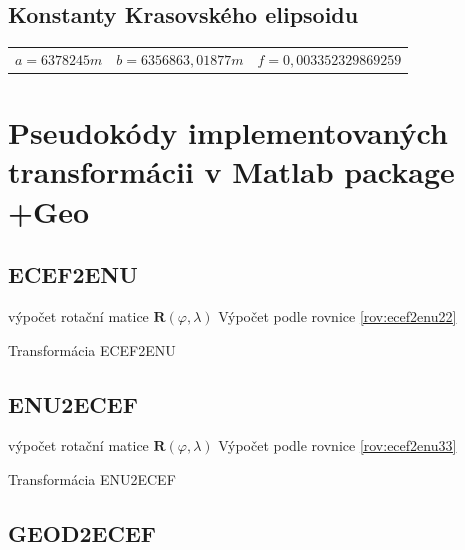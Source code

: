 \subsection{Konstanty Krasovského elipsoidu}
\begin{table}[ht!]
\begin{tabular}{c c c}
$a = 6 378 245 m$ & $b = 6 356 863,01877 m$ & $f = 0,00335 23298 69259$ \\
\end{tabular}
\end{table}


\section{Pseudokódy implementovaných transformácii v Matlab package +Geo}

\subsection{ECEF2ENU} \label{appEcef2Enu}

\begin{algorithm}[H]
 výpočet rotační matice $\mathbf{R}\left(\varphi, \lambda\right)$\;	
 Výpočet podle rovnice \ref{rov:ecef2enu22}
 \caption{Transformácia ECEF2ENU}
\end{algorithm} 

\subsection{ENU2ECEF} \label{appEnu2Ecef}

\begin{algorithm}[H]
 výpočet rotační matice $\mathbf{R}\left(\varphi, \lambda\right)$\;	
 Výpočet podle rovnice \ref{rov:ecef2enu33}
 \caption{Transformácia ENU2ECEF}
\end{algorithm} 

\subsection{GEOD2ECEF} \label{appGeod2Ecef}

